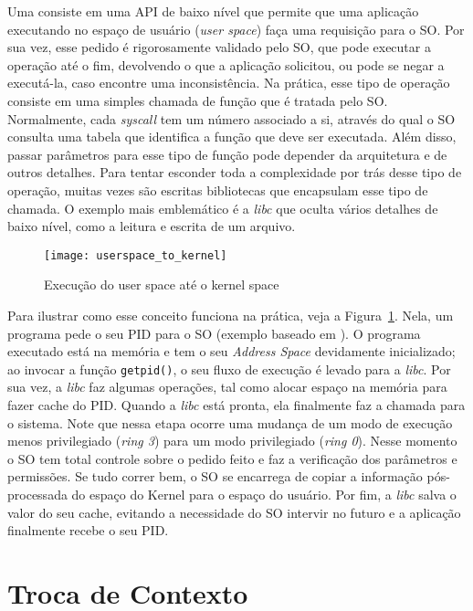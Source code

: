 Uma 
consiste em uma API de baixo nível que permite que uma aplicação executando no
espaço de usuário (\emph{user space}) faça uma requisição para o SO. Por sua
vez, esse pedido é rigorosamente validado pelo SO, que pode executar a operação
até o fim, devolvendo o que a aplicação solicitou, ou pode se negar a
executá-la, caso encontre uma inconsistência. Na prática, esse tipo de operação
consiste em uma simples chamada de função que é tratada pelo SO. Normalmente,
cada \emph{syscall} tem um número associado a si, através do qual o SO consulta
uma tabela que identifica a função que deve ser executada. Além disso, passar
parâmetros para esse tipo de função pode depender da arquitetura e de outros
detalhes. Para tentar esconder toda a complexidade por trás desse tipo de
operação, muitas vezes são escritas bibliotecas que encapsulam esse tipo de
chamada. O exemplo mais emblemático é a \emph{libc} que oculta vários detalhes
de baixo nível, como a leitura e escrita de um arquivo.

\begin{figure}[!h]
  \centering
  \texttt{[image: userspace\_to\_kernel]} 
  \caption{Execução do user space até o kernel space}
  \label{fig:userspace_kernelspace}
\end{figure}

Para ilustrar como esse conceito funciona na prática, veja a
Figura~\ref{fig:userspace_kernelspace}. Nela, um programa pede o
seu PID para o SO (exemplo baseado em \cite{syscallex}). O programa executado
está na memória e tem o seu \emph{Address Space} devidamente inicializado;
ao invocar a função \texttt{getpid()}, o seu fluxo de execução é levado para a
\emph{libc}. Por sua vez, a \emph{libc} faz algumas operações, tal como alocar
espaço na memória para fazer cache do PID. Quando a \emph{libc} está pronta,
ela finalmente faz a chamada para o sistema. Note que nessa etapa ocorre uma
mudança de um modo de execução menos privilegiado (\emph{ring 3}) para um modo
privilegiado (\emph{ring 0}). Nesse momento o SO tem total controle sobre o
pedido feito e faz a verificação dos parâmetros e permissões. Se tudo correr
bem, o SO se encarrega de copiar a informação pós-processada do espaço do
Kernel para o espaço do usuário. Por fim, a \emph{libc} salva o valor do seu
cache, evitando a necessidade do SO intervir no futuro e a aplicação finalmente
recebe o seu PID.

\section{Troca de Contexto}


